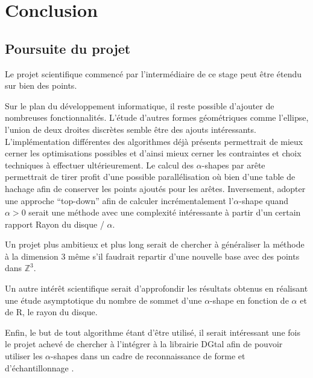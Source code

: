 \section{Conclusion}


\subsection{Poursuite du projet}

Le projet scientifique commencé par l'intermédiaire de ce stage peut être étendu sur bien des points. 

Sur le plan du développement informatique, il reste possible d'ajouter de nombreuses fonctionnalités. L’étude d'autres formes géométriques comme l'ellipse, l'union de deux droites discrètes semble être des ajouts intéressants. L'implémentation différentes des algorithmes déjà présents permettrait de mieux cerner les optimisations possibles et d'ainsi mieux cerner les contraintes et choix techniques à effectuer ultérieurement. 
Le calcul des $\alpha$-shapes par arête permettrait de tirer profit d'une possible parallélisation où bien d'une table de hachage afin de conserver les points ajoutés pour les arêtes. 
Inversement, adopter une approche ``top-down'' afin de calculer incrémentalement l'$\alpha$-shape quand $\alpha > 0$ serait une méthode avec une complexité intéressante à partir d'un certain rapport Rayon du disque / $\alpha$.

Un projet plus ambitieux et plus long serait de chercher à généraliser la méthode à la dimension 3 même s'il faudrait repartir d'une nouvelle base avec des points dans $\mathbb{Z}^{3}$. 

Un autre intérêt scientifique serait d'approfondir les résultats obtenus en réalisant une étude asymptotique du nombre de sommet d'une $\alpha$-shape en fonction de $\alpha$ et de R, le rayon du disque.

Enfin, le but de tout algorithme étant d'être utilisé, il serait intéressant une fois le projet achevé de chercher à l'intégrer à la librairie DGtal afin de pouvoir utiliser les $\alpha$-shapes dans un cadre de reconnaissance de forme et d’échantillonnage \cite{BernardiniB97}.


